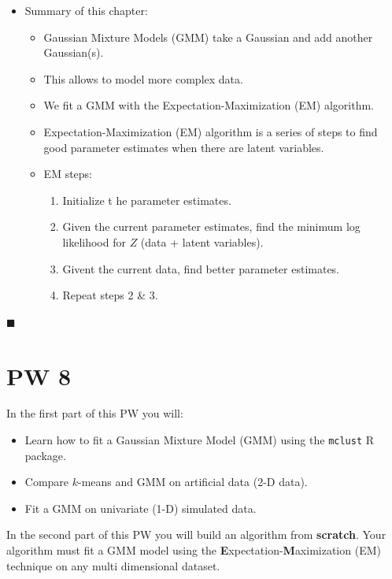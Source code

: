 \documentclass[]{book}
\providecommand{\tightlist}{%
  \setlength{\itemsep}{0pt}\setlength{\parskip}{0pt}}
\newenvironment{rmdblock}[1]
  {\begin{shaded*}
  \begin{itemize}
  \renewcommand{\labelitemi}{
    \raisebox{-.7\height}[0pt][0pt]{
      {\setkeys{Gin}{width=2em,keepaspectratio}\texttt{[image: img/icons/\#1]}}
    }
  }
  \item
  }
  {
  \end{itemize}
  \end{shaded*}
  }
\newenvironment{rmdinsight}
  {\begin{rmdblock}{insight}}
  {\end{rmdblock}}
\theoremstyle{definition}
\theoremstyle{definition}
\theoremstyle{definition}
\theoremstyle{remark}
\begin{document}
\begin{rmdinsight}
Summary of this chapter:

\begin{itemize}
\tightlist
\item
  Gaussian Mixture Models (GMM) take a Gaussian and add another
  Gaussian(s).
\item
  This allows to model more complex data.
\item
  We fit a GMM with the Expectation-Maximization (EM) algorithm.
\item
  Expectation-Maximization (EM) algorithm is a series of steps to find
  good parameter estimates when there are latent variables.
\item
  EM steps:

  \begin{enumerate}
  \def\labelenumi{\arabic{enumi}.}
  \tightlist
  \item
    Initialize t he parameter estimates.
  \item
    Given the current parameter estimates, find the minimum log
    likelihood for \(Z\) (data + latent variables).
  \item
    Givent the current data, find better parameter estimates.
  \item
    Repeat steps 2 \& 3.
  \end{enumerate}
\end{itemize}
\end{rmdinsight}

◼

\chapter*{PW 8}\label{pw-8}

In the first part of this PW you will:

\begin{itemize}
\tightlist
\item
  Learn how to fit a Gaussian Mixture Model (GMM) using the
  \texttt{mclust} R package.
\item
  Compare \(k\)-means and GMM on artificial data (2-D data).
\item
  Fit a GMM on univariate (1-D) simulated data.
\end{itemize}

In the second part of this PW you will build an algorithm from
\textbf{scratch}. Your algorithm must fit a GMM model using the
\textbf{E}xpectation-\textbf{M}aximization (EM) technique on any multi
dimensional dataset.
\end{document}
